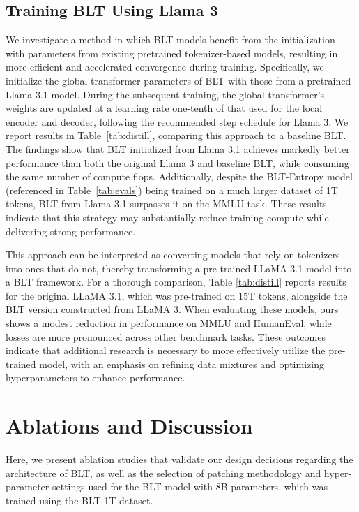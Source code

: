 \subsection{Training {\textsc BLT} Using Llama 3}
\label{sec:distillation}
We investigate a method in which {\textsc BLT} models benefit from the initialization with parameters from existing pretrained tokenizer-based models, resulting in more efficient and accelerated convergence during training. Specifically, we initialize the global transformer parameters of {\textsc BLT} with those from a pretrained Llama 3.1 model. During the subsequent training, the global transformer’s weights are updated at a learning rate one-tenth of that used for the local encoder and decoder, following the recommended step schedule for Llama 3. We report results in Table~\ref{tab:distill}, comparing this approach to a baseline {\textsc BLT}. The findings show that {\textsc BLT} initialized from Llama 3.1 achieves markedly better performance than both the original Llama 3 and baseline {\textsc BLT}, while consuming the same number of compute flops. Additionally, despite the {\textsc BLT}-Entropy model (referenced in Table~\ref{tab:evals}) being trained on a much larger dataset of 1T tokens, {\textsc BLT} from Llama 3.1 surpasses it on the MMLU task. These results indicate that this strategy may substantially reduce training compute while delivering strong performance.

This approach can be interpreted as converting models that rely on tokenizers into ones that do not, thereby transforming a pre-trained LLaMA 3.1 model into a {\textsc BLT} framework. For a thorough comparison, Table \ref{tab:distill} reports results for the original LLaMA 3.1, which was pre-trained on 15T tokens, alongside the {\textsc BLT} version constructed from LLaMA 3. When evaluating these models, ours shows a modest reduction in performance on MMLU and HumanEval, while losses are more pronounced across other benchmark tasks. These outcomes indicate that additional research is necessary to more effectively utilize the pre-trained model, with an emphasis on refining data mixtures and optimizing hyperparameters to enhance performance.

\section{Ablations and Discussion}
\label{section:ablations}
Here, we present ablation studies that validate our design decisions regarding the architecture of {\textsc BLT}, as well as the selection of patching methodology and hyper-parameter settings used for the {\textsc BLT} model with 8B parameters, which was trained using the {\textsc BLT}-1T dataset.

